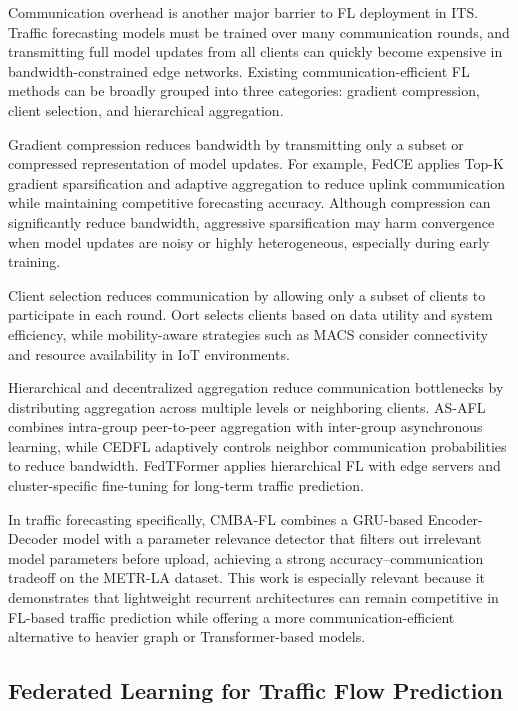Communication overhead is another major barrier to FL deployment in ITS. Traffic forecasting models must be trained over many communication rounds, and transmitting full model updates from all clients can quickly become expensive in bandwidth-constrained edge networks. Existing communication-efficient FL methods can be broadly grouped into three categories: gradient compression, client selection, and hierarchical aggregation.

Gradient compression reduces bandwidth by transmitting only a subset or compressed representation of model updates. For example, FedCE \cite{gao2024fedce} applies Top-K gradient sparsification and adaptive aggregation to reduce uplink communication while maintaining competitive forecasting accuracy. Although compression can significantly reduce bandwidth, aggressive sparsification may harm convergence when model updates are noisy or highly heterogeneous, especially during early training.

Client selection reduces communication by allowing only a subset of clients to participate in each round. Oort \cite{lai2021oort} selects clients based on data utility and system efficiency, while mobility-aware strategies such as MACS \cite{albelaihi2025} consider connectivity and resource availability in IoT environments.

Hierarchical and decentralized aggregation reduce communication bottlenecks by distributing aggregation across multiple levels or neighboring clients. AS-AFL \cite{ma2025asafl} combines intra-group peer-to-peer aggregation with inter-group asynchronous learning, while CEDFL \cite{wang2024cedfl} adaptively controls neighbor communication probabilities to reduce bandwidth. FedTFormer \cite{shuai2025fedtformer} applies hierarchical FL with edge servers and cluster-specific fine-tuning for long-term traffic prediction.

In traffic forecasting specifically, CMBA-FL \cite{zhu2025cmba} combines a GRU-based Encoder-Decoder model with a parameter relevance detector that filters out irrelevant model parameters before upload, achieving a strong accuracy--communication tradeoff on the METR-LA dataset. This work is especially relevant because it demonstrates that lightweight recurrent architectures can remain competitive in FL-based traffic prediction while offering a more communication-efficient alternative to heavier graph or Transformer-based models.

\subsection{Federated Learning for Traffic Flow Prediction}

